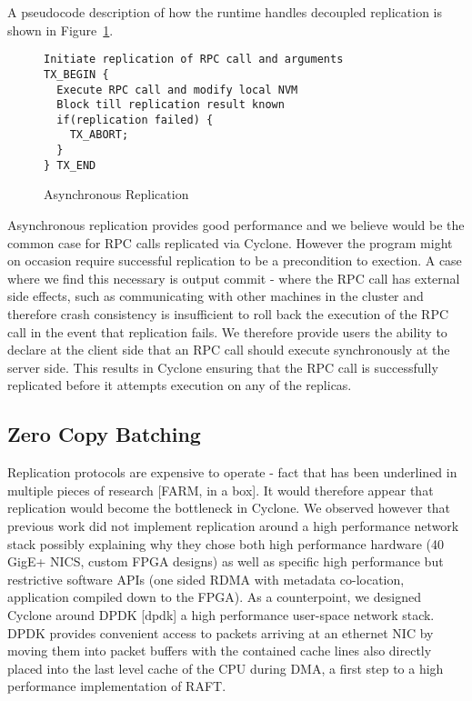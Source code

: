 \documentclass[twocolumn]{article}
\begin{document}
A pseudocode description of how the runtime handles decoupled replication is
shown in Figure~\ref{fig:async_rep}.

\begin{figure}
{ \scriptsize
\begin{verbatim}
Initiate replication of RPC call and arguments
TX_BEGIN {
  Execute RPC call and modify local NVM
  Block till replication result known
  if(replication failed) {
    TX_ABORT;
  }
} TX_END
\end{verbatim}
}
\caption{Asynchronous Replication}
\label{fig:async_rep}
\end{figure}

Asynchronous replication provides good performance and we believe would be the
common case for RPC calls replicated via Cyclone. However the program might on
occasion require successful replication to be a precondition to exection. A case
where we find this necessary is output commit - where the RPC call has external
side effects, such as communicating with other machines in the cluster and
therefore crash consistency is insufficient to roll back the execution of the
RPC call in the event that replication fails. We therefore provide users the
ability to declare at the client side that an RPC call should execute
synchronously at the server side. This results in Cyclone ensuring that the RPC
call is successfully replicated before it attempts execution on any of the
replicas.

\subsection{Zero Copy Batching}
Replication protocols are expensive to operate - fact that has been underlined in
multiple pieces of research [FARM, in a box]. It would therefore appear that
replication would become the bottleneck in Cyclone. We observed however that
previous work did not implement replication around a high performance network
stack possibly explaining why they chose both high performance hardware (40
GigE+ NICS, custom FPGA designs) as well as specific high performance but
restrictive software APIs (one sided RDMA with metadata co-location, application
compiled down to the FPGA). As a counterpoint, we designed Cyclone around DPDK
[dpdk] a high performance user-space network stack. DPDK provides convenient
access to packets arriving at an ethernet NIC by moving them into packet buffers
with the contained cache lines also directly placed into the last level cache of
the CPU during DMA, a first step to a high performance implementation of RAFT.
\end{document}
